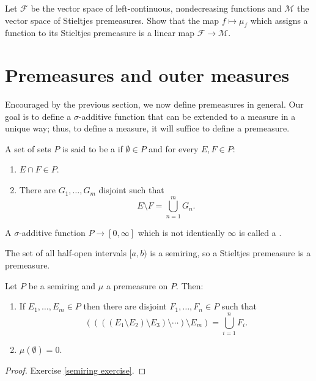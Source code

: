\begin{exercise}
Let $\mathcal F$ be the vector space of left-continuous, nondecreasing functions and $\mathcal M$ the vector space of Stieltjes premeasures.
Show that the map $f \mapsto \mu_f$ which assigns a function to its Stieltjes premeasure is a linear map $\mathcal F \to \mathcal M$.
\end{exercise}

\section{Premeasures and outer measures}
Encouraged by the previous section, we now define premeasures in general.
Our goal is to define a $\sigma$-additive function that can be extended to a measure in a unique way; thus, to define a measure, it will suffice to define a premeasure.

\begin{definition}
A set of sets $P$ is said to be a  if $\emptyset \in P$ and for every $E, F \in P$:
\begin{enumerate}
\item $E \cap F \in P$.
\item There are $G_1, \dots, G_m$ disjoint such that
\[E \setminus F = \bigcup_{n=1}^m G_n.\]
\end{enumerate}
A $\sigma$-additive function $P \to [0, \infty]$ which is not identically $\infty$ is called a .
\end{definition}

\begin{example}
The set of all half-open intervals $[a, b)$ is a semiring, so a Stieltjes premeasure is a premeasure.
\end{example}

\begin{lemma}
\label{semiring prop 1}
Let $P$ be a semiring and $\mu$ a premeasure on $P$. Then:
\begin{enumerate}
\item If $E_1, \dots, E_m \in P$ then there are disjoint $F_1, \dots, F_n \in P$ such that
\[((((E_1 \setminus E_2) \setminus E_3) \setminus \cdots) \setminus E_m) = \bigcup_{i=1}^n F_i.\]
\item $\mu(\emptyset) = 0$.
\end{enumerate}
\end{lemma}
\begin{proof}
Exercise \ref{semiring exercise}.
\end{proof}

